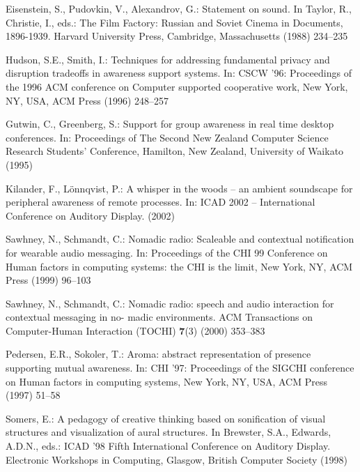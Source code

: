 \documentclass[runningheads]{llncs}
\begin{document}
\begin{thebibliography}{10}
Eisenstein, S., Pudovkin, V., Alexandrov, G.:
\newblock Statement on sound.
\newblock In Taylor, R., Christie, I., eds.: The Film Factory: Russian and
  Soviet Cinema in Documents, 1896-1939.
\newblock Harvard University Press, Cambridge, Massachusetts (1988)  234--235

Hudson, S.E., Smith, I.:
\newblock Techniques for addressing fundamental privacy and disruption
  tradeoffs in awareness support systems.
\newblock In: CSCW '96: Proceedings of the 1996 ACM conference on Computer
  supported cooperative work, New York, NY, USA, ACM Press (1996)  248--257

Gutwin, C., Greenberg, S.:
\newblock Support for group awareness in real time desktop conferences.
\newblock In: Proceedings of The Second New Zealand Computer Science Research
  Students' Conference, Hamilton, New Zealand, University of Waikato (1995)

Kilander, F., L\"{o}nnqvist, P.:
\newblock A whisper in the woods -- an ambient soundscape for peripheral
  awareness of remote processes.
\newblock In: ICAD 2002 -- International Conference on Auditory Display. (2002)

Sawhney, N., Schmandt, C.:
\newblock Nomadic radio: Scaleable and contextual notification for wearable
  audio messaging.
\newblock In: Proceedings of the CHI 99 Conference on Human factors in
  computing systems: the CHI is the limit, New York, NY, ACM Press (1999)
  96--103

Sawhney, N., Schmandt, C.:
\newblock Nomadic radio: speech and audio interaction for contextual messaging
  in no- madic environments.
\newblock ACM Transactions on Computer-Human Interaction (TOCHI) \textbf{7}(3)
  (2000)  353--383

Pedersen, E.R., Sokoler, T.:
\newblock Aroma: abstract representation of presence supporting mutual
  awareness.
\newblock In: CHI '97: Proceedings of the SIGCHI conference on Human factors in
  computing systems, New York, NY, USA, ACM Press (1997)  51--58

Somers, E.:
\newblock A pedagogy of creative thinking based on sonification of visual
  structures and visualization of aural structures.
\newblock In Brewster, S.A., Edwards, A.D.N., eds.: ICAD '98 Fifth
  International Conference on Auditory Display. Electronic Workshops in
  Computing, Glasgow, British Computer Society (1998)


\end{thebibliography}
\end{document}

